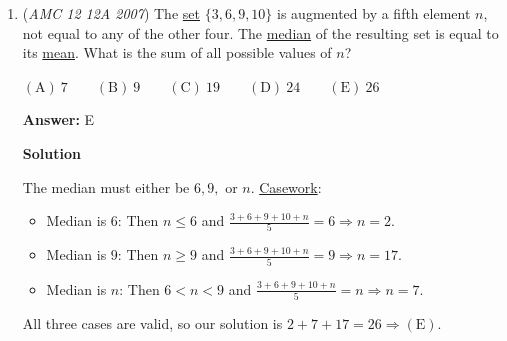 \begin{enumerate}
\textbf{Solution 2}

The prime factorization of $45$ is $3^2 * 5$. Therefore, the 5 distinct integer factors must have some negative numbers in them. Because there are two $3$'s in the prime factorization, one of them must be negative and the other positive. Because there is a $-3$, there must also be a $-1$ to cancel the negatives out. The 5 distinct integer factors must be $-3, 3, 5, -1, 1$. The corresponding values of $a, b, c, d,$ and $e$ are $9, 3, 1, 7, 5$. and their sum is $\fbox{25 (C)}$



	\item (\textit{AMC 12 12A 2007}) The \href{https://artofproblemsolving.com/wiki/index.php?title=Set}{set} $\{3,6,9,10\}$ is augmented by a fifth element $n$, not equal to any of the other four. The \href{https://artofproblemsolving.com/wiki/index.php?title=Median}{median} of the resulting set is equal to its \href{https://artofproblemsolving.com/wiki/index.php?title=Mean}{mean}. What is the sum of all possible values of $n$?


 $\mathrm{(A)}\ 7\qquad \mathrm{(B)}\ 9\qquad \mathrm{(C)}\ 19\qquad \mathrm{(D)}\ 24\qquad \mathrm{(E)}\ 26$

 \textbf{Answer: }E



\textbf{Solution}

The median must either be $6, 9,$ or $n$. \href{https://artofproblemsolving.com/wiki/index.php?title=Casework}{Casework}:

 
            \begin{itemize}
        \item Median is $6$: Then $n \le 6$ and $\frac{3+6+9+10+n}{5} = 6 \Longrightarrow n = 2$.
            \end{itemize}
            
            \begin{itemize}
        \item Median is $9$: Then $n \ge 9$ and $\frac{3+6+9+10+n}{5} = 9 \Longrightarrow n = 17$.
            \end{itemize}
            
            \begin{itemize}
        \item Median is $n$: Then $6 < n < 9$ and $\frac{3+6+9+10+n}{5} = n \Longrightarrow n = 7$.
            \end{itemize}
            All three cases are valid, so our solution is $2 + 7 + 17 = 26 \Longrightarrow \mathrm{(E)}$. 


\end{enumerate}
